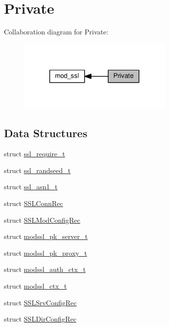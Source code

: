 \hypertarget{group__MOD__SSL__PRIVATE}{}\section{Private}
\label{group__MOD__SSL__PRIVATE}
Collaboration diagram for Private\+:
\nopagebreak
\begin{figure}[H]
\begin{center}
\leavevmode
\includegraphics[width=216pt]{group__MOD__SSL__PRIVATE}
\end{center}
\end{figure}
\subsection*{Data Structures}
\begin{DoxyCompactItemize}
\item 
struct \hyperlink{structssl__require__t}{ssl\+\_\+require\+\_\+t}
\item 
struct \hyperlink{structssl__randseed__t}{ssl\+\_\+randseed\+\_\+t}
\item 
struct \hyperlink{structssl__asn1__t}{ssl\+\_\+asn1\+\_\+t}
\item 
struct \hyperlink{structSSLConnRec}{S\+S\+L\+Conn\+Rec}
\item 
struct \hyperlink{structSSLModConfigRec}{S\+S\+L\+Mod\+Config\+Rec}
\item 
struct \hyperlink{structmodssl__pk__server__t}{modssl\+\_\+pk\+\_\+server\+\_\+t}
\item 
struct \hyperlink{structmodssl__pk__proxy__t}{modssl\+\_\+pk\+\_\+proxy\+\_\+t}
\item 
struct \hyperlink{structmodssl__auth__ctx__t}{modssl\+\_\+auth\+\_\+ctx\+\_\+t}
\item 
struct \hyperlink{structmodssl__ctx__t}{modssl\+\_\+ctx\+\_\+t}
\item 
struct \hyperlink{structSSLSrvConfigRec}{S\+S\+L\+Srv\+Config\+Rec}
\item 
struct \hyperlink{structSSLDirConfigRec}{S\+S\+L\+Dir\+Config\+Rec}
\end{DoxyCompactItemize}
